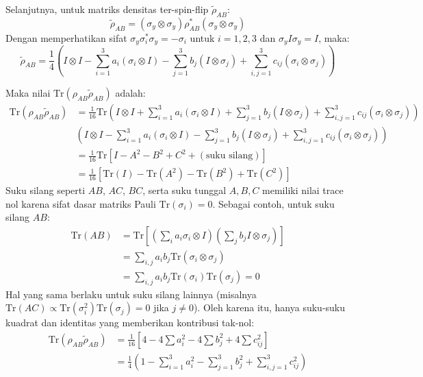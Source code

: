 Selanjutnya, untuk matriks densitas ter-spin-flip $\tilde{\rho}_{AB}$:
\begin{equation*}
	\tilde{\rho}_{AB} = (\sigma_y \otimes \sigma_y) \rho_{AB}^* (\sigma_y \otimes \sigma_y)
\end{equation*}
Dengan memperhatikan sifat $\sigma_y \sigma_i^* \sigma_y = -\sigma_i$ untuk $i=1,2,3$ dan $\sigma_y I \sigma_y = I$, maka:
\begin{equation*}
	\tilde{\rho}_{AB} = \frac{1}{4} \left( I \otimes I - \sum_{i=1}^3 a_i (\sigma_i \otimes I) - \sum_{j=1}^3 b_j (I \otimes \sigma_j) + \sum_{i,j=1}^3 c_{ij} (\sigma_i \otimes \sigma_j) \right)
\end{equation*}

Maka nilai $\text{Tr}(\rho_{AB} \tilde{\rho}_{AB})$ adalah:
\begin{align*}
	\text{Tr}(\rho_{AB} \tilde{\rho}_{AB}) &= \frac{1}{16} \text{Tr} \left( I \otimes I + \sum_{i=1}^3 a_i (\sigma_i \otimes I) + \sum_{j=1}^3 b_j (I \otimes \sigma_j) + \sum_{i,j=1}^3 c_{ij} (\sigma_i \otimes \sigma_j) \right)\\
	&\left( I \otimes I - \sum_{i=1}^3 a_i (\sigma_i \otimes I) - \sum_{j=1}^3 b_j (I \otimes \sigma_j) + \sum_{i,j=1}^3 c_{ij} (\sigma_i \otimes \sigma_j)\right) \\
	&= \frac{1}{16} \text{Tr} \left[ I - A^2 - B^2 + C^2 + (\text{suku silang}) \right] \\
	&= \frac{1}{16} \left[ \text{Tr}(I) - \text{Tr}(A^2) - \text{Tr}(B^2) + \text{Tr}(C^2) \right]
\end{align*}
Suku silang seperti $AB$, $AC$, $BC$, serta suku tunggal $A, B, C$ memiliki nilai trace nol karena sifat dasar matriks Pauli $\text{Tr}(\sigma_i) = 0$. Sebagai contoh, untuk suku silang $AB$:
\begin{align*}
	\text{Tr}(AB) &= \text{Tr} \left[ \left( \sum_i a_i \sigma_i \otimes I \right) \left( \sum_j b_j I \otimes \sigma_j \right) \right] \\
	&= \sum_{i,j} a_i b_j \text{Tr}(\sigma_i \otimes \sigma_j) \\
	&= \sum_{i,j} a_i b_j \text{Tr}(\sigma_i) \text{Tr}(\sigma_j) = 0
\end{align*}
Hal yang sama berlaku untuk suku silang lainnya (misalnya $\text{Tr}(AC) \propto \text{Tr}(\sigma_i^2) \text{Tr}(\sigma_j) = 0$ jika $j \neq 0$). Oleh karena itu, hanya suku-suku kuadrat dan identitas yang memberikan kontribusi tak-nol:
\begin{align*}
	\text{Tr}(\rho_{AB} \tilde{\rho}_{AB}) &= \frac{1}{16} \left[ 4 - 4 \sum a_i^2 - 4 \sum b_j^2 + 4 \sum c_{ij}^2 \right] \\
	&= \frac{1}{4} \left( 1 - \sum_{i=1}^3 a_i^2 - \sum_{j=1}^3 b_j^2 + \sum_{i,j=1}^3 c_{ij}^2 \right)
\end{align*}

